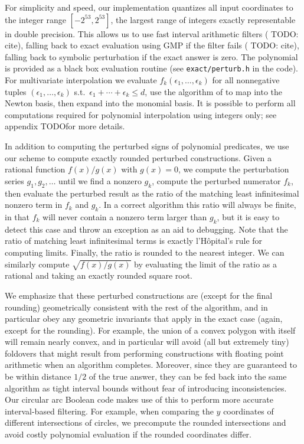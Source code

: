 \documentclass[11pt]{article}
\newcommand{\TODO}{{\color{red} TODO}}
\begin{document}
For simplicity and speed, our implementation quantizes all input coordinates to the integer range $[-2^{53},2^{53}]$, the largest range of integers exactly representable in
double precision.  This allows us to use fast interval arithmetic filters (\TODO: cite), falling back to exact evaluation using GMP if the filter fails (\TODO: cite), falling back
to symbolic perturbation if the exact answer is zero.  The polynomial is provided as a black box evaluation routine (see \verb+exact/perturb.h+ in the code).  For multivariate
interpolation we evaluate $f_k(\epsilon_1, \ldots, \epsilon_k)$ for all nonnegative tuples $(\epsilon_1, \ldots, \epsilon_k)$ s.t.\ $\epsilon_1 + \cdots + \epsilon_k \le d$,
use the algorithm of \cite{neidinger2009multivariable} to map into the Newton basis, then expand into the monomial basis.  It is possible to perform all computations required
for polynomial interpolation using integers only; see appendix \TODO for more details.

In addition to computing the perturbed signs of polynomial predicates, we use our scheme to compute exactly rounded perturbed constructions.  Given a rational function $f(x)/g(x)$
with $g(x) = 0$, we compute the perturbation series $g_1, g_2, \ldots$ until we find a nonzero $g_k$, compute the perturbed numerator $f_k$, then evaluate the perturbed result as
the ratio of the matching least infinitesimal nonzero term in $f_k$ and $g_k$.  In a correct algorithm this ratio will always be finite, in that $f_k$ will never contain a nonzero term
larger than $g_k$, but it is easy to detect this case and throw an exception as an aid to debugging.  Note that the ratio of matching least infinitesimal terms is exactly l'H\^opital's
rule for computing limits.  Finally, the ratio is rounded to the nearest integer.  We can similarly compute $\sqrt{f(x)/g(x)}$ by evaluating the limit of the ratio as a rational and
taking an exactly rounded square root.

We emphasize that these perturbed constructions are (except for the final rounding) geometrically consistent with the rest of the algorithm, and in particular obey any geometric
invariants that apply in the exact case (again, except for the rounding).  For example, the union of a convex polygon with itself will remain nearly convex, and in particular will
avoid (all but extremely tiny) foldovers that might result from performing constructions with floating point arithmetic when an algorithm completes.  Moreover, since they
are guaranteed to be within distance $1/2$ of the true answer, they can be fed back into the same algorithm as tight interval bounds without fear of introducing inconsistencies.  Our
circular arc Boolean code makes use of this to perform more accurate interval-based filtering.  For example, when comparing the $y$ coordinates of different intersections of circles,
we precompute the rounded intersections and avoid costly polynomial evaluation if the rounded coordinates differ.
\end{document}
